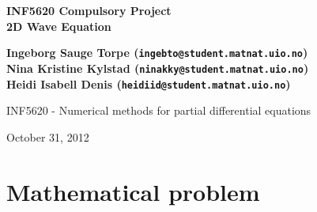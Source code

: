 \documentclass[twoside]{article}
\begin{document}






\begin{center}
{\LARGE\bf INF5620 Compulsory Project}\\
{\LARGE\bf 2D Wave Equation}
\end{center}





\begin{center}
{\bf Ingeborg Sauge Torpe (\texttt{ingebto@student.matnat.uio.no})} \\ [0mm]
{\bf Nina Kristine Kylstad (\texttt{ninakky@student.matnat.uio.no})} \\ [0mm]
{\bf Heidi Isabell Denis (\texttt{heidiid@student.matnat.uio.no})} \\ [0mm]
\end{center}

\begin{center}
\centerline{INF5620 - Numerical methods for partial differential equations}
\end{center}





\begin{center}
October 31, 2012
\end{center}

\vspace{1cm}



\begin{abstract}
This report investigates the two dimensional wave equation with variable coefficients.



\end{abstract}

\tableofcontents





\section{Mathematical problem}
\end{document}
